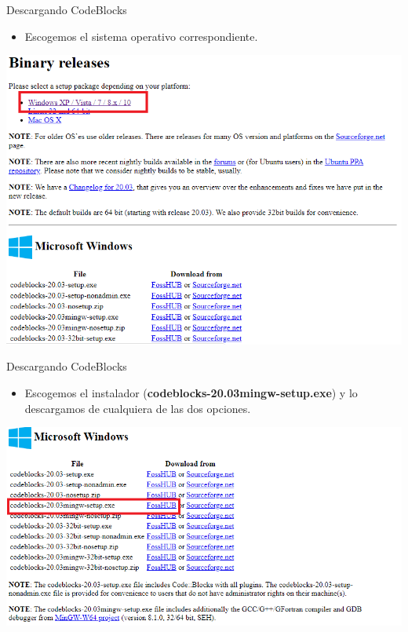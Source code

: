 \documentclass[11pt]{beamer}
\begin{document}
\begin{frame}{Descargando CodeBlocks}
    \justifying
\begin{itemize}
    \item Escogemos el sistema operativo correspondiente.
\end{itemize}
    \includegraphics[width=\textwidth]{cb5.png}
\end{frame}

\begin{frame}{Descargando CodeBlocks}
    \justifying
\begin{itemize}
    \item Escogemos el instalador (\textbf{codeblocks-20.03mingw-setup.exe}) y lo descargamos de cualquiera de las dos opciones.
\end{itemize}
    \includegraphics[width=\textwidth]{cb6.png}
\end{frame}
\end{document}
